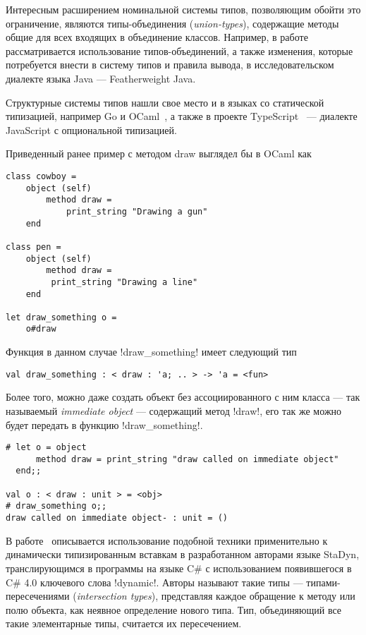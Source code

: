 Интересным расширением номинальной системы типов, позволяющим обойти это
ограничение, являются типы-объединения (\emph{union-types}), содержащие методы
общие для всех входящих в объединение классов. Например, в
работе~\cite{Igarashi2006} рассматривается использование типов-объединений, а
также изменения, которые потребуется внести в систему типов и правила вывода, в
исследовательском диалекте языка Java --- Featherweight Java.

Структурные системы типов нашли свое место и в языках со статической
типизацией, например Go и OCaml~\cite[с.~33]{Ocaml}, а также в проекте
TypeScript~\cite[]{TypeScript} --- диалекте JavaScript с опциональной
типизацией. 

Приведенный ранее пример с методом draw выглядел бы в OCaml как

\lstset{language=[Objective]Caml}
\begin{lstlisting}
class cowboy =
    object (self)
        method draw =
            print_string "Drawing a gun"
    end

class pen = 
    object (self) 
        method draw =
         print_string "Drawing a line"
    end

let draw_something o =
    o#draw

\end{lstlisting}

Функция в данном случае !draw_something! имеет следующий тип

\begin{lstlisting}
val draw_something : < draw : 'a; .. > -> 'a = <fun>
\end{lstlisting}

Более того, можно даже создать объект без ассоциированного с ним класса --- так
называемый \emph{immediate object} --- содержащий метод !draw!, его так
же можно будет передать в функцию !draw_something!.

\begin{lstlisting}
# let o = object
      method draw = print_string "draw called on immediate object"
  end;;

val o : < draw : unit > = <obj>
# draw_something o;;
draw called on immediate object- : unit = ()
\end{lstlisting}
\lstset{language=Python}

В работе~\cite{Ortin2011:union} описывается использование подобной техники
применительно к динамически типизированным вставкам в разработанном авторами
языке StaDyn, транслирующимся в программы на языке C\# с использованием
появившегося в C\# 4.0 ключевого слова !dynamic!.  Авторы называют такие
типы --- типами-пересечениями (\emph{intersection types}), представляя каждое
обращение к методу или полю объекта, как неявное определение нового типа. Тип,
объединяющий все такие элементарные типы, считается их пересечением.

